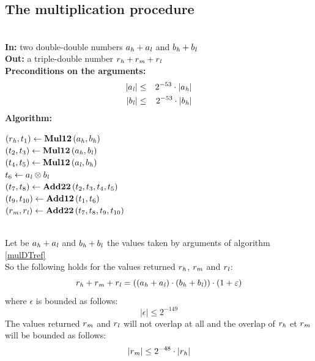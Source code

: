 \subsection{The multiplication procedure \MulDT}
\begin{algorithm}[\MulDT] \label{mulDTref} ~ \\
{\bf In:} two double-double numbers $a_{\mathit{h}} + a_{\mathit{l}}$ and $b_{\mathit{h}} + b_{\mathit{l}}$ \\
{\bf Out:} a triple-double number $r_{\mathit{h}} + r_{\mathit{m}} + r_{\mathit{l}}$ \\
{\bf Preconditions on the arguments:}
\begin{eqnarray*}
\left \vert a_{\mathit{l}} \right \vert & \leq & 2^{-53} \cdot \left \vert a_{\mathit{h}} \right \vert \\
\left \vert b_{\mathit{l}} \right \vert & \leq & 2^{-53} \cdot \left \vert b_{\mathit{h}} \right \vert \\
\end{eqnarray*}
{\bf Algorithm:} \\
\begin{center}
\begin{minipage}[b]{50mm}
$\left( r_{\mathit{h}}, t_1 \right) \gets \mathbf{Mul12}\left( a_{\mathit{h}}, b_{\mathit{h}} \right)$ \\
$\left( t_2, t_3 \right) \gets \mathbf{Mul12}\left( a_{\mathit{h}}, b_{\mathit{l}} \right)$ \\
$\left( t_4, t_5 \right) \gets \mathbf{Mul12}\left( a_{\mathit{l}}, b_{\mathit{h}} \right)$ \\
$t_6 \gets a_{\mathit{l}} \otimes b_{\mathit{l}}$ \\
$\left( t_7, t_8 \right) \gets \mathbf{Add22}\left( t_2, t_3, t_4, t_5 \right)$ \\
$\left( t_9, t_{10} \right) \gets \mathbf{Add12}\left( t_1, t_6 \right)$ \\
$\left( r_{\mathit{m}}, r_{\mathit{l}} \right) \gets \mathbf{Add22}\left( t_7, t_8, t_9, t_{10} \right)$ \\
\end{minipage}
\end{center}
\end{algorithm}
\begin{theorem} ~ \\
Let be $a_{\mathit{h}} + a_{\mathit{l}}$ and $b_{\mathit{h}} + b_{\mathit{l}}$ the values taken by arguments of algorithm \ref{mulDTref} \MulDT \\
So the following holds for the values returned $r_{\mathit{h}}$, $r_{\mathit{m}}$ and $r_{\mathit{l}}$:
$$r_{\mathit{h}} + r_{\mathit{m}} + r_{\mathit{l}} = \left(\left(a_{\mathit{h}} + a_{\mathit{l}} \right) \cdot \left( b_{\mathit{h}} + b_{\mathit{l}} \right)\right) \cdot \left(1 + \varepsilon\right)$$
where $\epsilon$ is bounded as follows:
$$\left \vert \epsilon \right \vert \leq 2^{-149}$$
The values returned $r_{\mathit{m}}$ and $r_{\mathit{l}}$ will not overlap at all and the overlap of $r_{\mathit{h}}$ et $r_{\mathit{m}}$ will be bounded as
follows:
$$\left \vert r_{\mathit{m}} \right \vert \leq 2^{-48} \cdot \left \vert r_{\mathit{h}} \right \vert$$
\end{theorem}

